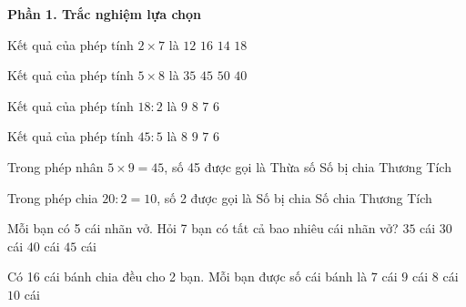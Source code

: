 \textbf{Phần 1. Trắc nghiệm lựa chọn}

\begin{ex} %
Kết quả của phép tính $2 \times 7$ là
\choice
{$12$}
{$16$}
{\True $14$}
{$18$}
\end{ex}

\begin{ex} %
Kết quả của phép tính $5 \times 8$ là
\choice
{$35$}
{$45$}
{$50$}
{\True $40$}
\end{ex}

\begin{ex} %
Kết quả của phép tính $18 : 2$ là
\choice
{\True $9$}
{$8$}
{$7$}
{$6$}
\end{ex}

\begin{ex} %
Kết quả của phép tính $45 : 5$ là
\choice
{$8$}
{\True $9$}
{$7$}
{$6$}
\end{ex}

\begin{ex} %
Trong phép nhân $5 \times 9 = 45$, số 45 được gọi là
\choice
{Thừa số}
{Số bị chia}
{Thương}
{\True Tích}
\end{ex}

\begin{ex} %
Trong phép chia $20 : 2 = 10$, số 2 được gọi là
\choice
{Số bị chia}
{\True Số chia}
{Thương}
{Tích}
\end{ex}

\begin{ex} %
Mỗi bạn có 5 cái nhãn vở. Hỏi 7 bạn có tất cả bao nhiêu cái nhãn vở?
\choice
{\True $35$ cái}
{$30$ cái}
{$40$ cái}
{$45$ cái}
\end{ex}

\begin{ex} %
Có 16 cái bánh chia đều cho 2 bạn. Mỗi bạn được số cái bánh là
\choice
{$7$ cái}
{$9$ cái}
{\True $8$ cái}
{$10$ cái}
\end{ex}


